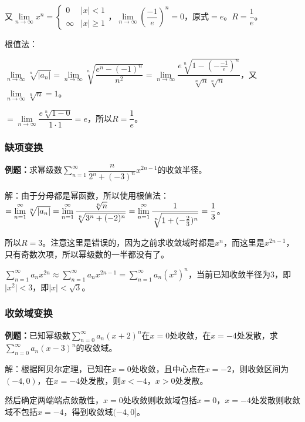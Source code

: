 \documentclass[UTF8, 12pt]{ctexart}
\begin{document}
又$\lim\limits_{n\to\infty}x^n=\left\{\begin{array}{ll}
    0 & \vert x\vert<1 \\
    \infty & \vert x\vert\geqslant1
\end{array}\right.$，$\lim\limits_{n\to\infty}\left(\dfrac{-1}{e}\right)^n=0$，原式$=e$。$R=\dfrac{1}{e}$。

根值法：

$\lim\limits_{n\to\infty}\sqrt[n]{\vert a_n\vert}=\lim\limits_{n\to\infty}\sqrt[n]{\dfrac{e^n-(-1)^n}{n^2}}=\lim\limits_{n\to\infty}\dfrac{e\sqrt[n]{1-(-\frac{-1}{e})^n}}{\sqrt[n]{n}\sqrt[n]{n}}$，又$\lim\limits_{n\to\infty}\sqrt[n]{n}=1$。

$=\lim\limits_{n\to\infty}\dfrac{e\sqrt[n]{1-0}}{1\cdot1}=e$，所以$R=\dfrac{1}{e}$。

\subsubsection{缺项变换}

\textbf{例题：}求幂级数$\sum\limits_{n=1}^\infty\dfrac{n}{2^n+(-3)^n}x^{2n-1}$的收敛半径。

解：由于分母都是幂函数，所以使用根值法：$=\lim\limits_{n=1}^\infty\sqrt[n]{\vert a_n\vert}=\lim\limits_{n=1}^\infty\dfrac{\sqrt[n]{n}}{\sqrt[n]{3^n+(-2)^n}}\\=\lim\limits_{n=1}^\infty\dfrac{1}{\sqrt[n]{1+(-\frac{2}{3})^n}}=\dfrac{1}{3}$。

所以$R=3$。注意这里是错误的，因为之前求收敛域时都是$x^n$，而这里是$x^{2n-1}$，只有奇数次项，所以幂级数的一半都没有了。

$\sum\limits_{n=1}^\infty a_nx^{2n}\approx\sum\limits_{n=1}^\infty a_nx^{2n-1}=\sum\limits_{n=1}^\infty a_n(x^2)^n$，当前已知收敛半径为$3$，即$\vert x^2\vert<3$，即$\vert x\vert<\sqrt{3}$。

\subsubsection{收敛域变换}

\textbf{例题：}已知幂级数$\sum\limits_{n=0}^\infty a_n(x+2)^n$在$x=0$处收敛，在$x=-4$处发散，求$\sum\limits_{n=0}^\infty a_n(x-3)^n$的收敛域。

解：根据阿贝尔定理，已知在$x=0$处收敛，且中心点在$x=-2$，则收敛区间为$(-4,0)$，在$x=-4$处发散，则$x<-4$，$x>0$处发散。

然后确定两端端点敛散性，$x=0$处收敛则收敛域包括$x=0$，$x=-4$处发散则收敛域不包括$x=-4$，得到收敛域$(-4,0]$。
\end{document}
